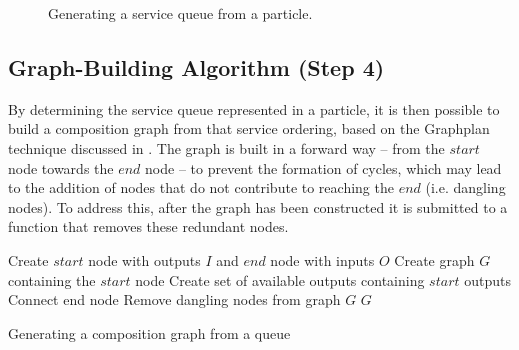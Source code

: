 \documentclass{llncs}
\begin{document}
\begin{figure}[h]
\centerline{
}
 \caption{Generating a service queue from a particle.}
 \label{queue}
\end{figure}

\subsection{Graph-Building Algorithm (Step 4)}

By determining the service queue represented in a particle, it is then possible to build a composition graph from that service ordering, based on the Graphplan technique discussed in \cite{blum1997fast}. The graph is built in a forward way -- from the $start$ node towards the $end$ node -- to prevent the formation of cycles, which may lead to the addition of nodes that do not contribute to reaching the $end$ (i.e. dangling nodes). To address this, after the graph has been constructed it is submitted to a function that removes these redundant nodes.

\begin{algorithm}[!htb]
 \setlength{}
 \LinesNumbered
 \SetNlSty{}{}{:}
 Create $start$ node with outputs $I$ and $end$ node with inputs $O$\;
 Create graph $G$ containing the $start$ node\;
 Create set of available outputs containing $start$ outputs\;
 Connect end node\;
 Remove dangling nodes from graph $G$\;
 \KwRet $G$\;
 \caption{Generating a composition graph from a queue}
\label{graph_building}
\end{algorithm}
\end{document}
